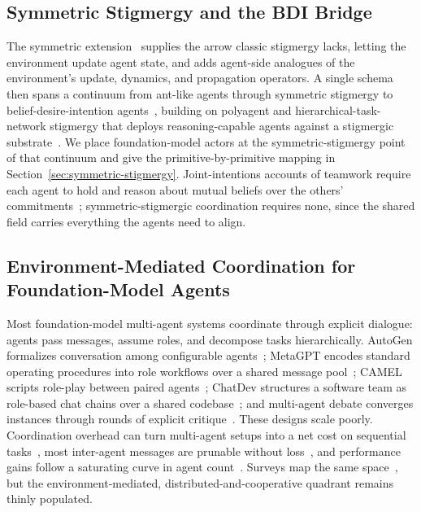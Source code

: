 \subsection{Symmetric Stigmergy and the BDI Bridge}

The symmetric extension~\cite{parunak2025insects} supplies the arrow classic stigmergy lacks, letting the environment update agent state, and adds agent-side analogues of the environment's update, dynamics, and propagation operators. A single schema then spans a continuum from ant-like agents through symmetric stigmergy to belief-desire-intention agents~\cite{bratman1987intentions,raogeorgeff1995bdi}, building on polyagent and hierarchical-task-network stigmergy that deploys reasoning-capable agents against a stigmergic substrate~\cite{brueckner2000return,brueckner2009saso}. We place foundation-model actors at the symmetric-stigmergy point of that continuum and give the primitive-by-primitive mapping in Section~\ref{sec:symmetric-stigmergy}. Joint-intentions accounts of teamwork require each agent to hold and reason about mutual beliefs over the others' commitments~\cite{cohen1991teamwork}; symmetric-stigmergic coordination requires none, since the shared field carries everything the agents need to align.

\subsection{Environment-Mediated Coordination for Foundation-Model Agents}

Most foundation-model multi-agent systems coordinate through explicit dialogue: agents pass messages, assume roles, and decompose tasks hierarchically. AutoGen formalizes conversation among configurable agents~\cite{wu2023autogen}; MetaGPT encodes standard operating procedures into role workflows over a shared message pool~\cite{hong2024metagpt}; CAMEL scripts role-play between paired agents~\cite{li2023camel}; ChatDev structures a software team as role-based chat chains over a shared codebase~\cite{qian2024chatdev}; and multi-agent debate converges instances through rounds of explicit critique~\cite{du2024debate}. These designs scale poorly. Coordination overhead can turn multi-agent setups into a net cost on sequential tasks~\cite{kim2025scaling}, most inter-agent messages are prunable without loss~\cite{zhang2025agentprune}, and performance gains follow a saturating curve in agent count~\cite{qian2025macnet}. Surveys map the same space~\cite{guo2024llmmas_survey}, but the environment-mediated, distributed-and-cooperative quadrant remains thinly populated.

